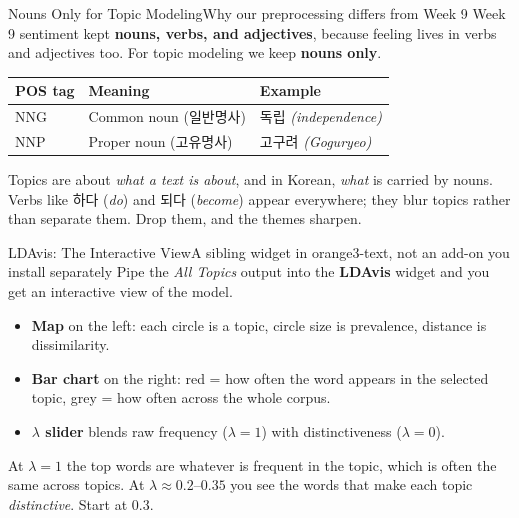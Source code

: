 \documentclass[aspectratio=169,10pt]{beamer}
\begin{document}
\begin{frame}{Nouns Only for Topic Modeling}{Why our preprocessing differs from Week 9}
  Week 9 sentiment kept \textbf{nouns, verbs, and adjectives}, because feeling lives in verbs and adjectives too.
  For topic modeling we keep \textbf{nouns only}.

  \vspace{0.5em}
  \begin{center}
    \small
    \begin{tabular}{@{}l l l@{}}
      \toprule
      \textbf{POS tag} & \textbf{Meaning}       & \textbf{Example} \\
      \midrule
      NNG              & Common noun (일반명사)   & 독립 \emph{(independence)} \\
      NNP              & Proper noun (고유명사)   & 고구려 \emph{(Goguryeo)} \\
      \bottomrule
    \end{tabular}
  \end{center}

  \vspace{0.6em}
  \begin{callcoral}
    Topics are about \emph{what a text is about}, and in Korean, \emph{what} is carried by nouns.
    Verbs like 하다 (\emph{do}) and 되다 (\emph{become}) appear everywhere; they blur topics rather than separate them.
    Drop them, and the themes sharpen.
  \end{callcoral}
\end{frame}

\begin{frame}{LDAvis: The Interactive View}{A sibling widget in orange3-text, not an add-on you install separately}
  Pipe the \emph{All Topics} output into the \textbf{LDAvis} widget and you get an interactive view of the model.
  \begin{itemize}
    \item \textbf{Map} on the left: each circle is a topic, circle size is prevalence, distance is dissimilarity.
    \item \textbf{Bar chart} on the right: red = how often the word appears in the selected topic, grey = how often across the whole corpus.
    \item \textbf{$\lambda$ slider} blends raw frequency ($\lambda = 1$) with distinctiveness ($\lambda = 0$).
  \end{itemize}

  \vspace{0.4em}
  \begin{callblue}
    At $\lambda = 1$ the top words are whatever is frequent in the topic, which is often the same across topics. At
    $\lambda \approx 0.2$--$0.35$ you see the words that make each topic \emph{distinctive}. Start at $0.3$.
  \end{callblue}
\end{frame}
\end{document}
